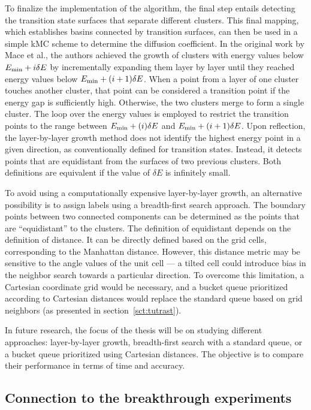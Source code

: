 \documentclass[main]{subfiles}
\begin{document}
To finalize the implementation of the algorithm, the final step entails detecting the transition state surfaces that separate different clusters. This final mapping, which establishes basins connected by transition surfaces, can then be used in a simple kMC scheme to determine the diffusion coefficient. In the original work by Mace et al.\autocite{Mace_2019}, the authors achieved the growth of clusters with energy values below $E_{\text{min}}+i\delta E$ by incrementally expanding them layer by layer until they reached energy values below $E_{\text{min}}+(i+1)\delta E$. When a point from a layer of one cluster touches another cluster, that point can be considered a transition point if the energy gap is sufficiently high. Otherwise, the two clusters merge to form a single cluster. The loop over the energy values is employed to restrict the transition points to the range between $E_{\text{min}}+(i)\delta E$ and $E_{\text{min}}+(i+1)\delta E$. Upon reflection, the layer-by-layer growth method does not identify the highest energy point in a given direction, as conventionally defined for transition states. Instead, it detects points that are equidistant from the surfaces of two previous clusters. Both definitions are equivalent if the value of $\delta E$ is infinitely small.

To avoid using a computationally expensive layer-by-layer growth, an alternative possibility is to assign labels using a breadth-first search approach. The boundary points between two connected components can be determined as the points that are ``equidistant'' to the clusters. The definition of equidistant depends on the definition of distance. It can be directly defined based on the grid cells, corresponding to the Manhattan distance. However, this distance metric may be sensitive to the angle values of the unit cell --- a tilted cell could introduce bias in the neighbor search towards a particular direction. To overcome this limitation, a Cartesian coordinate grid would be necessary, and a bucket queue prioritized according to Cartesian distances would replace the standard queue based on grid neighbors (as presented in section~\ref{sct:tutrast}).

In future research, the focus of the thesis will be on studying different approaches: layer-by-layer growth, breadth-first search with a standard queue, or a bucket queue prioritized using Cartesian distances. The objective is to compare their performance in terms of time and accuracy.

\subsection{Connection to the breakthrough experiments}
\end{document}
